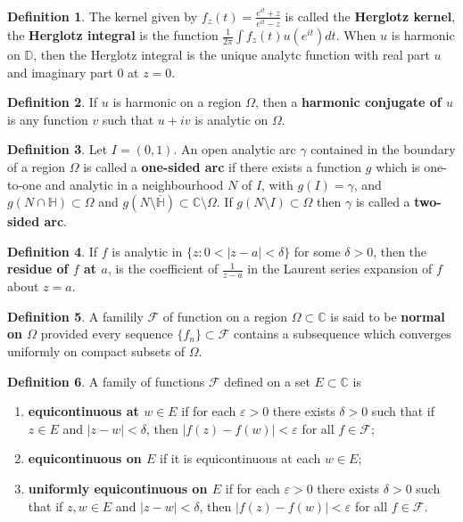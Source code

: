 \documentclass[12pt]{article}
\theoremstyle{definition}
\newtheorem{definition}{Definition}
\newcommand{\D}{\mathbb{D}}      %
\renewcommand{\H}{\mathbb{H}}      %
\newcommand{\eps}{\varepsilon}    %
\newcommand{\C}{\mathbb{C}}    %
\begin{document}
\begin{definition}
    The kernel given by $f_z(t)=\frac{e^{it}+z}{e^{it}-z}$ is called the \textbf{Herglotz kernel}, the \textbf{Herglotz integral} is the function $\frac{1}{2\pi}\int f_z(t)u(e^{it})dt$. When $u$ is harmonic on $\D$, then the Herglotz integral is the unique analytc function with real part $u$ and imaginary part $0$ at $z=0$.
\end{definition}

\begin{definition}
    If $u$ is harmonic on a region $\Omega$, then a \textbf{harmonic conjugate of $u$} is any function $v$ such that $u+iv$ is analytic on $\Omega$.
\end{definition}

\begin{definition}
    Let $I=(0,1)$. An open analytic arc $\gamma$ contained in the boundary of a region $\Omega$ is called a \textbf{one-sided arc} if there exists a function $g$ which is one-to-one and analytic in a neighbourhood $N$ of $I$, with $g(I)=\gamma$, and $g(N\cap \H)\subset\Omega$ and $g(N\setminus \overline{\H})\subset \C\setminus\Omega$. If $g(N\setminus I)\subset\Omega$ then $\gamma$ is called a \textbf{two-sided arc}.
\end{definition}

\begin{definition}
    If $f$ is analytic in $\{z:0<|z-a|<\delta\}$ for some $\delta>0$, then the \textbf{residue of $f$ at $a$}, is the coefficient of $\frac{1}{z-a}$ in the Laurent series expansion of $f$ about $z=a$. 
\end{definition}

\begin{definition}
    A familily $\mathcal{F}$ of function on a region $\Omega\subset\C$ is said to be \textbf{normal on $\Omega$} provided every sequence $\{f_n\}\subset\mathcal{F}$ contains a subsequence which converges uniformly on compact subsets of $\Omega$.
\end{definition}
\newpage
\begin{definition}
    A family of functions $\mathcal{F}$ defined on a set $E\subset\C$ is
    \begin{enumerate}[label=(\alph*)]
        \item \textbf{equicontinuous at $w\in E$} if for each $\eps>0$ there exists $\delta>0$ such that if $z\in E$ and $|z-w|<\delta$, then $|f(z)-f(w)|<\eps$ for all $f\in\mathcal{F}$;
        \item \textbf{equicontinuous on $E$} if it is equicontinuous at each $w\in E$;
        \item \textbf{uniformly equicontinuous on $E$} if for each $\eps>0$ there exists $\delta>0$ such that if $z,w\in E$ and $|z-w|<\delta$, then $|f(z)-f(w)|<\eps$ for all $f\in\mathcal{F}$.
    \end{enumerate}
\end{definition}
\end{document}
